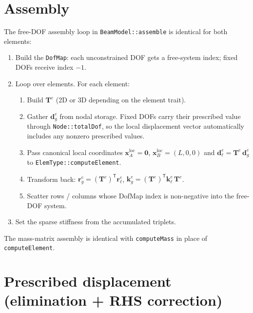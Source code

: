 \documentclass[11pt,a4paper]{book}
\newcommand{\bmath}[1]{\boldsymbol{#1}}
\begin{document}
\section{Assembly}\label{sec:assembly}

The free-DOF assembly loop in \texttt{BeamModel::assemble} is identical for both elements:
\begin{enumerate}
    \item Build the \texttt{DofMap}: each unconstrained DOF gets a free-system index; fixed DOFs receive index $-1$.
    \item Loop over elements. For each element:
    \begin{enumerate}
        \item Build $\bmath{T}^e$ (2D or 3D depending on the element trait).
        \item Gather $\bmath{d}_g^e$ from nodal storage. Fixed DOFs carry their prescribed value through \texttt{Node::totalDof}, so the local displacement vector automatically includes any nonzero prescribed values.
        \item Pass canonical local coordinates $\bmath{x}_A^{\text{loc}} = \bmath{0}$, $\bmath{x}_B^{\text{loc}} = (L,0,0)$ and $\bmath{d}_\ell^e = \bmath{T}^e\,\bmath{d}_g^e$ to \texttt{ElemType::computeElement}.
        \item Transform back: $\bmath{r}_g^e = (\bmath{T}^e)^\mathsf{T}\bmath{r}_\ell^e$, $\bmath{k}_g^e = (\bmath{T}^e)^\mathsf{T}\bmath{k}_\ell^e\,\bmath{T}^e$.
        \item Scatter rows / columns whose DofMap index is non-negative into the free-DOF system.
    \end{enumerate}
    \item Set the sparse stiffness from the accumulated triplets.
\end{enumerate}

The mass-matrix assembly is identical with \texttt{computeMass} in place of \texttt{computeElement}.

\section{Prescribed displacement (elimination + RHS correction)}\label{sec:prescribed}
\end{document}
